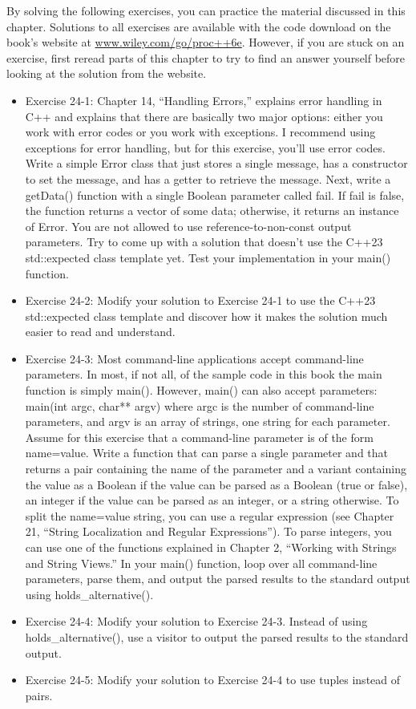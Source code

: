 By solving the following exercises, you can practice the material discussed in this chapter. Solutions to all exercises are available with the code download on the book’s website at \url{www.wiley.com/go/proc++6e}. However, if you are stuck on an exercise, first reread parts of this chapter to try to find an answer yourself before looking at the solution from the website.

\begin{itemize}
\item
Exercise 24-1: Chapter 14, “Handling Errors,” explains error handling in C++ and explains that there are basically two major options: either you work with error codes or you work with exceptions. I recommend using exceptions for error handling, but for this exercise, you’ll use error codes. Write a simple Error class that just stores a single message, has a constructor to set the message, and has a getter to retrieve the message. Next, write a getData() function with a single Boolean parameter called fail. If fail is false, the function returns a vector of some data; otherwise, it returns an instance of Error. You are not allowed to use reference-to-non-const output parameters. Try to come up with a solution that doesn’t use the C++23 std::expected class template yet. Test your implementation in your main() function.

\item
Exercise 24-2: Modify your solution to Exercise 24-1 to use the C++23 std::expected class template and discover how it makes the solution much easier to read and understand.

\item
Exercise 24-3: Most command-line applications accept command-line parameters. In most, if not all, of the sample code in this book the main function is simply main(). However, main() can also accept parameters: main(int argc, char** argv) where argc is the number of command-line parameters, and argv is an array of strings, one string for each parameter. Assume for this exercise that a command-line parameter is of the form name=value. Write a function that can parse a single parameter and that returns a pair containing the name of the parameter and a variant containing the value as a Boolean if the value can be parsed as a Boolean (true or false), an integer if the value can be parsed as an integer, or a string otherwise. To split the name=value string, you can use a regular expression (see Chapter 21, “String Localization and Regular Expressions”). To parse integers, you can use one of the functions explained in Chapter 2, “Working with Strings and String Views.” In your main() function, loop over all command-line parameters, parse them, and output the parsed results to the standard output using holds\_alternative().

\item
Exercise 24-4: Modify your solution to Exercise 24-3. Instead of using holds\_alternative(), use a visitor to output the parsed results to the standard output.

\item
Exercise 24-5: Modify your solution to Exercise 24-4 to use tuples instead of pairs.
\end{itemize}


